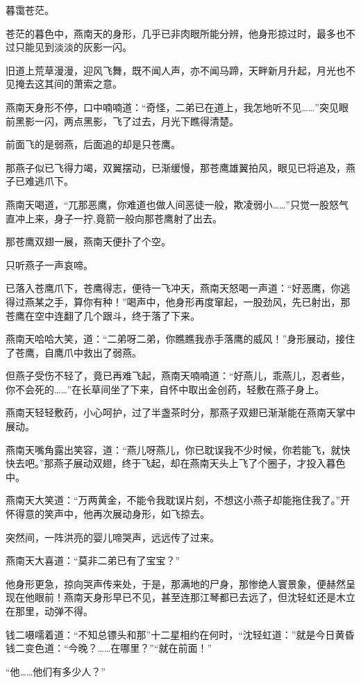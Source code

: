 \documentclass[12pt,oneside]{book}
\begin{document}
暮霭苍茫。

苍茫的暮色中，燕南天的身形，几乎已非肉眼所能分辨，他身形掠过时，最多也不过只能见到淡淡的灰影一闪。

旧道上荒草漫漫，迎风飞舞，既不闻人声，亦不闻马蹄，天畔新月升起，月光也不见掩去这其间的萧索之意。

燕南天身形不停，口中喃喃道：``奇怪，二弟已在道上，我怎地听不见\ldots\ldots{}''突见眼前黑影一闪，两点黑影，飞了过去，月光下瞧得清楚。

前面飞的是弱燕，后面追的却是只苍鹰。

那燕子似已飞得力竭，双翼摆动，已渐缓慢，那苍鹰雄翼拍风，眼见已将追及，燕子已难逃爪下。

燕南天喝道，``兀那恶鹰，你难道也做人间恶徒一般，欺凌弱小\ldots\ldots{}''只觉一股怒气直冲上来，身子一拧,竟箭一般向那苍鹰射了出去。

那苍鹰双翅一展，燕南天便扑了个空。

只听燕子一声哀啼。

已落入苍鹰爪下，苍鹰得志，便待一飞冲天，燕南天怒喝一声道：``好恶鹰，你逃得过燕某之手，算你有种！''喝声中，他身形再度窜起，一股劲风，先已射出，那苍鹰在空中连翻了几个跟斗，终于落了下来。

燕南天哈哈大笑，道：``二弟呀二弟，你瞧瞧我赤手落鹰的威风！''身形展动，接住了苍鹰，自鹰爪中救出了弱燕。

但燕子受伤不轻了，竟已再难飞起，燕南天喃喃道：``好燕儿，乖燕儿，忍者些，你不会死的\ldots\ldots{}''在长草间坐了下来，自怀中取出金创药，轻敷在燕子身上。

燕南天轻轻敷药，小心呵护，过了半盏茶时分，那燕子双翅已渐渐能在燕南天掌中展动。

燕南天嘴角露出笑容，道：``燕儿呀燕儿，你已耽误我不少时候，你若能飞，就快快去吧。''那燕子展动双翅，终于飞起，却在燕南天头上飞了个圈子，才投入暮色中。

燕南天大笑道：``万两黄金，不能令我耽误片刻，不想这小燕子却能拖住我了。''开怀得意的笑声中，他再次展动身形，如飞掠去。

突然间，一阵洪亮的婴儿啼哭声，远远传了过来。

燕南天大喜道：``莫非二弟已有了宝宝？''

他身形更急，掠向哭声传来处，于是，那满地的尸身，那惨绝人寰景象，便赫然呈现在他眼前！燕南天身形早已不见，甚至连那江琴都已去远了，但沈轻虹还是木立在那里，动弹不得。

钱二嗫嚅着道：``不知总镖头和那''十二星相约在何时，``沈轻虹道：''就是今日黄昏钱二变色道：``今晚？\ldots\ldots 在哪里？''``就在前面！''

``他\ldots\ldots 他们有多少人？''
\end{document}
